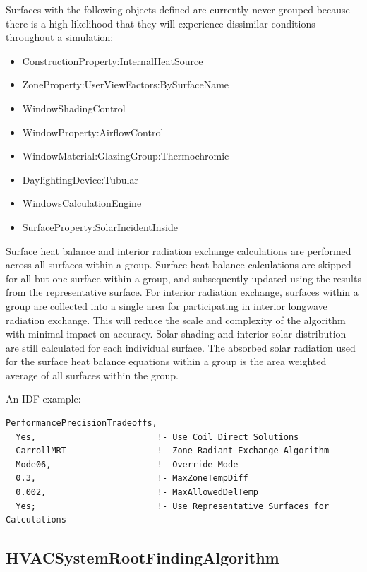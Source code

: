 Surfaces with the following objects defined are currently never grouped because there is a high likelihood that they will experience dissimilar conditions throughout a simulation:

\begin{itemize}
    \item ConstructionProperty:InternalHeatSource
    \item ZoneProperty:UserViewFactors:BySurfaceName
    \item WindowShadingControl
    \item WindowProperty:AirflowControl
    \item WindowMaterial:GlazingGroup:Thermochromic
    \item DaylightingDevice:Tubular
    \item WindowsCalculationEngine
    \item SurfaceProperty:SolarIncidentInside
\end{itemize}

Surface heat balance and interior radiation exchange calculations are performed across all surfaces within a group. Surface heat balance calculations are skipped for all but one surface within a group, and subsequently updated using the results from the representative surface. For interior radiation exchange, surfaces within a group are collected into a single area for participating in interior longwave radiation exchange. This will reduce the scale and complexity of the algorithm with minimal impact on accuracy. Solar shading and interior solar distribution are still calculated for each individual surface. The absorbed solar radiation used for the surface heat balance equations within a group is the area weighted average of all surfaces within the group.

An IDF example:

\begin{lstlisting}
PerformancePrecisionTradeoffs,
  Yes,                        !- Use Coil Direct Solutions
  CarrollMRT                  !- Zone Radiant Exchange Algorithm
  Mode06,                     !- Override Mode
  0.3,                        !- MaxZoneTempDiff
  0.002,                      !- MaxAllowedDelTemp
  Yes;                        !- Use Representative Surfaces for Calculations
\end{lstlisting}

\subsection{HVACSystemRootFindingAlgorithm}\label{hvacystemrootfindingalgorithm}

